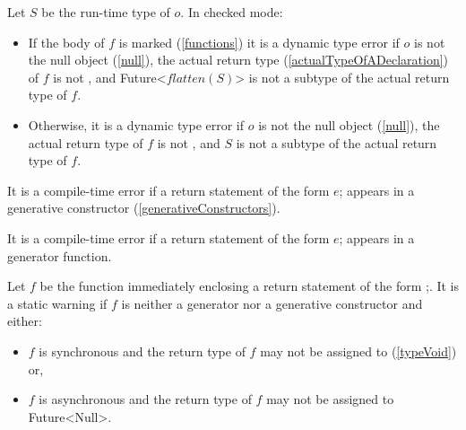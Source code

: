 \documentclass{article}
\newcommand{\code}[1]{{\sf #1}}
\begin{document}
\LMHash{}
Let $S$ be the run-time type of $o$. In checked mode:
\begin{itemize}
\item  If the body of $f$ is marked \ASYNC{} (\ref{functions})
it is a dynamic type error if $o$ is not the null object (\ref{null}),
the actual return type (\ref{actualTypeOfADeclaration}) of $f$ is not \VOID,
and \code{Future<$flatten(S)$>} is not a subtype of the actual return type of $f$.
\item Otherwise, it is a dynamic type error if $o$ is not the null object (\ref{null}),
the actual return type of $f$ is not \VOID{},
and $S$ is not a subtype of the actual return type of $f$.
\end{itemize}

\LMHash{}
It is a compile-time error if a return statement of the form \code{\RETURN{} $e$;} appears in a generative constructor (\ref{generativeConstructors}).


\LMHash{}
It is a compile-time error if a return statement of the form \code{\RETURN{} $e$;} appears in a generator function.


\LMHash{}
Let $f$ be the function immediately enclosing a return statement of the form \RETURN{};.
It is a static warning if $f$ is neither a generator nor a generative constructor and either:
\begin{itemize}
\item  $f$ is synchronous and the return type of $f$ may not be assigned to \VOID{} (\ref{typeVoid}) or,
\item  $f$ is asynchronous and the return type of $f$ may not be assigned to \code{Future<Null>}.
\end{itemize}
\end{document}
